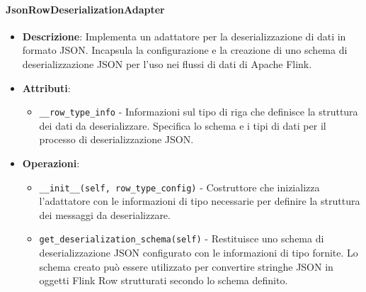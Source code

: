 \documentclass[10pt]{article}
\begin{document}
    \paragraph{JsonRowDeserializationAdapter}
    \begin{itemize} 
    \item \textbf{Descrizione}: Implementa un adattatore per la deserializzazione di dati in formato JSON. Incapsula la configurazione e la creazione di uno schema di deserializzazione JSON per l'uso nei flussi di dati di Apache Flink.
    \item \textbf{Attributi}:
    \begin{itemize}
        \item \texttt{\_\_row\_type\_info} - Informazioni sul tipo di riga che definisce la struttura dei dati da deserializzare. Specifica lo schema e i tipi di dati per il processo di deserializzazione JSON.
    \end{itemize}
    
    \item \textbf{Operazioni}:
    \begin{itemize}
        \item \texttt{\_\_init\_\_(self, row\_type\_config)} - Costruttore che inizializza l'adattatore con le informazioni di tipo necessarie per definire la struttura dei messaggi da deserializzare.
        
        \item \texttt{get\_deserialization\_schema(self)} - Restituisce uno schema di deserializzazione JSON configurato con le informazioni di tipo fornite. Lo schema creato può essere utilizzato per convertire stringhe JSON in oggetti Flink Row strutturati secondo lo schema definito.
    \end{itemize}
    \end{itemize}
\end{document}

